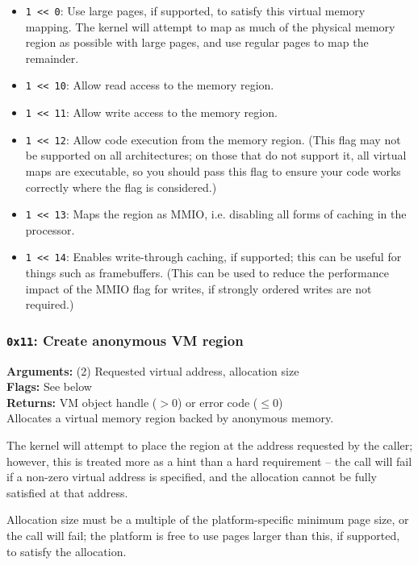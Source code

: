 \documentclass[11pt]{article}
\begin{document}
\begin{itemize}
\item \texttt{1 << 0}: Use large pages, if supported, to satisfy this virtual memory mapping. The kernel will attempt to map as much of the physical memory region as possible with large pages, and use regular pages to map the remainder.
\item \texttt{1 << 10}: Allow read access to the memory region.
\item \texttt{1 << 11}: Allow write access to the memory region.
\item \texttt{1 << 12}: Allow code execution from the memory region. (This flag may not be supported on all architectures; on those that do not support it, all virtual maps are executable, so you should pass this flag to ensure your code works correctly where the flag is considered.)
\item \texttt{1 << 13}: Maps the region as MMIO, i.e. disabling all forms of caching in the processor.
\item \texttt{1 << 14}: Enables write-through caching, if supported; this can be useful for things such as framebuffers. (This can be used to reduce the performance impact of the MMIO flag for writes, if strongly ordered writes are not required.)
\end{itemize}

\subsubsection{{\tt 0x11}: Create anonymous VM region}
\textbf{Arguments:} (2) Requested virtual address, allocation size  \\
\textbf{Flags:} See below \\
\textbf{Returns:} VM object handle ($>0$) or error code ($\leq0$) \\

Allocates a virtual memory region backed by anonymous memory.

The kernel will attempt to place the region at the address requested by the caller; however, this is treated more as a hint than a hard requirement -- the call will fail if a non-zero virtual address is specified, and the allocation cannot be fully satisfied at that address.

Allocation size must be a multiple of the platform-specific minimum page size, or the call will fail; the platform is free to use pages larger than this, if supported, to satisfy the allocation.
\end{document}
